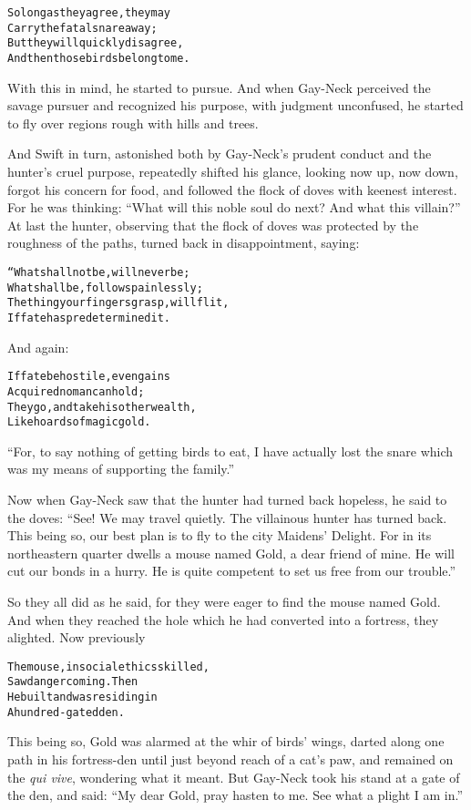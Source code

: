 \documentclass{article}
\renewenvironment{verbatim}{\begin{alltt}\normalfont\begin{centering}}{\end{centering}\end{alltt}}
\begin{document}
\begin{verbatim}
So long as they agree, they may
Carry the fatal snare away;
But they will quickly disagree,
And then those birds belong to me.
\end{verbatim}
With this in mind, he started to pursue. And when Gay-Neck
perceived the savage pursuer and recognized his purpose, with
judgment unconfused, he started to fly over regions rough with
hills and trees.

And Swift in turn, astonished both by Gay-Neck's prudent conduct
and the hunter's cruel purpose, repeatedly shifted his glance,
looking now up, now down, forgot his concern for food, and followed
the flock of doves with keenest interest. For he was thinking:
``What will this noble soul do next? And what this villain?'' At
last the hunter, observing that the flock of doves was protected by
the roughness of the paths, turned back in disappointment, saying:

\begin{verbatim}
“What shall not be, will never be;
What shall be, follows painlessly;
The thing your fingers grasp, will flit,
If fate has predetermined it.
\end{verbatim}
And again:

\begin{verbatim}
If fate be hostile, even gains
Acquired no man can hold;
They go, and take his other wealth,
Like hoards of magic gold.
\end{verbatim}
``For, to say nothing of getting birds to eat, I have actually lost the snare which was my means of supporting the family.''

Now when Gay-Neck saw that the hunter had turned back hopeless, he
said to the doves:
``See! We may travel quietly. The villainous hunter has turned back. This being so, our best plan is to fly to the city Maidens' Delight. For in its northeastern quarter dwells a mouse named Gold, a dear friend of mine. He will cut our bonds in a hurry. He is quite competent to set us free from our trouble.''

So they all did as he said, for they were eager to find the mouse
named Gold. And when they reached the hole which he had converted
into a fortress, they alighted. Now previously

\begin{verbatim}
The mouse, in social ethics skilled,
    Saw danger coming. Then
He built and was residing in
    A hundred-gated den.
\end{verbatim}
This being so, Gold was alarmed at the whir of birds' wings, darted
along one path in his fortress-den until just beyond reach of a
cat's paw, and remained on the \emph{qui vive}, wondering what it
meant. But Gay-Neck took his stand at a gate of the den, and said:
``My dear Gold, pray hasten to me. See what a plight I am in.''
\end{document}
